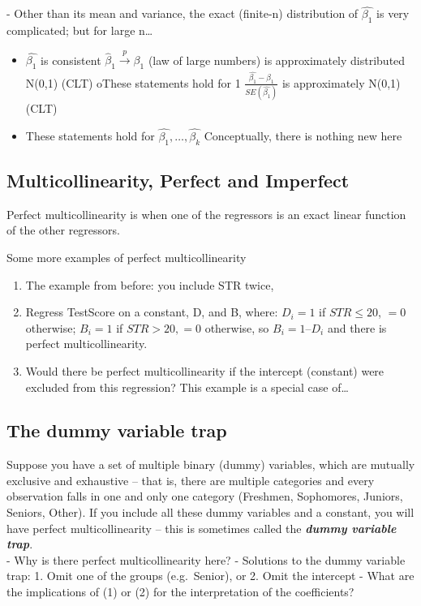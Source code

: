 \documentclass[
  letterpaper,
  DIV=11,
  numbers=noendperiod]{scrartcl}
\providecommand{\tightlist}{%
  \setlength{\itemsep}{0pt}\setlength{\parskip}{0pt}}\usepackage{longtable,booktabs,array}
\begin{document}
- Other than its mean and variance, the exact (finite-n) distribution of
\(\hat{\beta_1}\) is very complicated; but for large n\ldots{}

\begin{itemize}
\item
  \(\hat{\beta_1}\) is consistent
  \(\hat\beta_1 \xrightarrow[]{p} \beta_1\) (law of large numbers) is
  approximately distributed N(0,1) (CLT) oThese statements hold for 1
  \(\frac{\hat{\beta_1} - \beta_1}{SE(\hat{\beta_1})}\) is approximately
  N(0,1) (CLT)
\item
  These statements hold for \(\hat{\beta_1},\dots,\hat{\beta_k}\)
  Conceptually, there is nothing new here
\end{itemize}

\hypertarget{multicollinearity-perfect-and-imperfect}{%
\subsection{Multicollinearity, Perfect and
Imperfect}\label{multicollinearity-perfect-and-imperfect}}

Perfect multicollinearity is when one of the regressors is an exact
linear function of the other regressors.

Some more examples of perfect multicollinearity

\begin{enumerate}
\def\labelenumi{\arabic{enumi}.}
\tightlist
\item
  The example from before: you include STR twice,
\item
  Regress TestScore on a constant, D, and B, where: \(D_i = 1\) if
  \(STR ≤ 20\), \(= 0\) otherwise; \(B_i = 1\) if \(STR >20, = 0\)
  otherwise, so \(B_i = 1 – D_i\) and there is perfect
  multicollinearity.
\item
  Would there be perfect multicollinearity if the intercept (constant)
  were excluded from this regression? This example is a special case
  of\ldots{}
\end{enumerate}

\hypertarget{the-dummy-variable-trap}{%
\subsection{The dummy variable trap}\label{the-dummy-variable-trap}}

Suppose you have a set of multiple binary (dummy) variables, which are
mutually exclusive and exhaustive -- that is, there are multiple
categories and every observation falls in one and only one category
(Freshmen, Sophomores, Juniors, Seniors, Other). If you include all
these dummy variables and a constant, you will have perfect
multicollinearity -- this is sometimes called the \textbf{\emph{dummy
variable trap}}.\\
- Why is there perfect multicollinearity here? - Solutions to the dummy
variable trap: 1. Omit one of the groups (e.g.~Senior), or 2. Omit the
intercept - What are the implications of (1) or (2) for the
interpretation of the coefficients?
\end{document}
